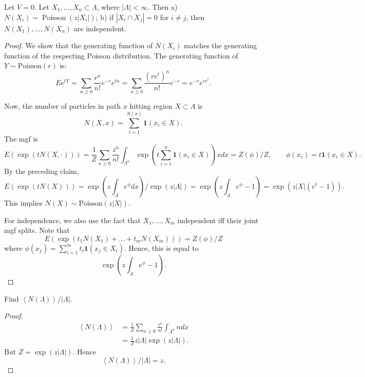 \begin{Lemma}
	Let $V=0$. Let $X_1, \ldots, X_n \subset \Lambda$, where $|\Lambda|<\infty$. Then
a) $N\left(X_i\right) \sim \operatorname{Poisson}\left(z\left|X_i\right|\right)$;
b) if $\left|X_i \cap X_j\right|=0$ for $i \neq j$, then $N\left(X_1\right), \ldots, N\left(X_n\right)$ are independent.
\end{Lemma}
\begin{proof}
	We show that the generating function of $N(X_i)$ matches the generating function of the respecting Poisson distribution. The generating function of $Y \sim \text{Poisson}(r)$ is:
	\[
		E e^{t Y} 
		= \sum_{n \ge 0} \frac{r^n}{n!}e^{-r} e^{tn}
		= \sum_{n \ge 0} \frac{(re^t)^n}{n!}e^{-r}
		= e^{-r} e^{r e^{t} } 
	.\] 

	Now, the number of particles in path $x$ hitting region $X \subset \Lambda$ is
	\[
		N(X, x) = \sum_{i = 1}^{N(x)} \mathbf{1}(x_i \in X)
	.\] 
	The mgf is
	\[
		E(\exp\left(tN(X, \cdot ) \right) ) = \frac{1}{Z} \sum_{n \ge 0} \frac{z^n}{n!} \int _{\Lambda^n} \exp\left(t \sum_{i = 1}^n \mathbf{1}(x_i \in X)  \right) xdx = Z(\phi) / Z, \qquad \phi(x_i) = t \mathbf{1}(x_i \in X)
	.\] 
	By the preceding claim,
	\[
		E\left( \exp\left(t N(X) \right)  \right) 
		= \exp\left(z \int _{\Lambda} e^{\phi} dx \right) / \exp\left( z |\Lambda| \right) 
		= 
		\exp\left(z \int _{\Lambda} e^{\phi}  - 1 \right) 
		= \exp\left( z |X|(e^t - 1) \right) 
	.\] 
	This implies $ N(X) \sim \text{Poisson}(z |X|)$.

	For independence, we also use the fact that $X_1, \ldots, X_m$ independent iff their joint mgf splits.
	Note that
	\[
		E\left( \exp\left(t_1 N(X_1) + \ldots + t_m N(X_m) \right)  \right) 
		= Z(\phi) / Z
	\] 
	where $\phi(x_j) = \sum_{i = 1}^m t_i \mathbf{1}\left( x_j \in X_i \right) $.
	Hence, this is equal to
	\[
		\exp\left(z \int _{\Lambda} e^{\phi}  - 1 \right) 
	.\] 
	
\end{proof}

\begin{problem}
	Find $\left\langle N(\Lambda) \right\rangle  / |\Lambda|$.
\end{problem}
\begin{proof}
	\begin{align*}
		\left\langle N(\Lambda) \right\rangle 
		&= \frac{1}{Z} \sum_{n \ge 0} \frac{z^n}{n!}\int _{\Lambda^n} n dx \\
		&= \frac{1}{Z} z |\Lambda| \exp\left(z |\Lambda| \right) 
	.\end{align*}
	But $Z = \exp\left(z \left| \Lambda \right|  \right) $. Hence
	\[
		\left\langle N(\Lambda) \right\rangle / \left| \Lambda \right|  = z
	.\] 
\end{proof}

